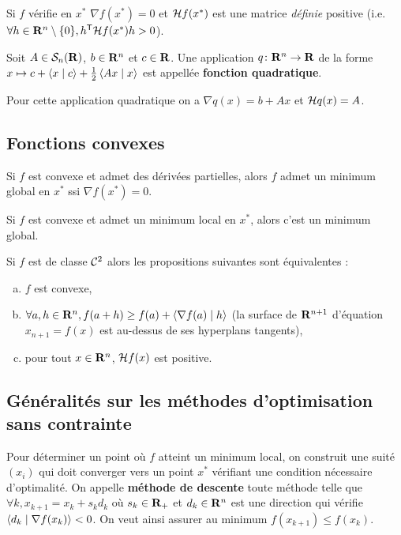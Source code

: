 \begin{thm}
	Si $f$ vérifie en $x^*$ $\nabla f(x^*) = 0$ et $\mathcal{H} f(x^*)$ est une matrice \emph{définie} positive (i.e. $\forall h \in \mathbf{R}^n \setminus \{ 0 \}, h^\mathsf{T} \mathcal{H} f(x^*) h > 0$).
\end{thm}

\begin{defn}
	Soit $A \in \mathcal{S}_n(\mathbf{R})$, $b \in \mathbf{R}^n$ et $c \in \mathbf{R}$.
	Une application $q \colon \mathbf{R}^n \to \mathbf{R}$ de la forme $x \mapsto c + \left\langle x \mid c \right\rangle + \frac{1}{2} \left\langle Ax \mid x \right\rangle$ est appellée \textbf{fonction quadratique}.
\end{defn}

Pour cette application quadratique on a $\nabla q(x) = b + Ax$ et $\mathcal{H} q(x) = A$.


\subsection{Fonctions convexes}

	\begin{thm}
		Si $f$ est convexe et admet des dérivées partielles, alors $f$ admet un minimum global en $x^*$ ssi $\nabla f(x^*) = 0$.
	\end{thm}

	\begin{thm}
		Si $f$ est convexe et admet un minimum local en $x^*$, alors c'est un minimum global.
	\end{thm}

	\begin{thm}
		Si $f$ est de classe $\mathcal{C}^2$ alors les propositions suivantes sont équivalentes :
		\begin{enumerate}[(a)]
			\item $f$ est convexe,
			\item $\forall a, h \in \mathbf{R}^n, f(a + h) \geq f(a) + \left\langle \nabla f(a) \mid h \right\rangle$ (la surface de $\mathbf{R}^{n + 1}$ d'équation $x_{n + 1} = f(x)$ est au-dessus de ses hyperplans tangents),
			\item pour tout $x \in \mathbf{R}^n$, $\mathcal{H} f(x)$ est positive.
		\end{enumerate}
	\end{thm}


\subsection{Généralités sur les méthodes d'optimisation sans contrainte}

	Pour déterminer un point où $f$ atteint un minimum local, on construit une suité $(x_i)$ qui doit converger vers un point $x^*$ vérifiant une condition nécessaire d'optimalité.
	On appelle \textbf{méthode de descente} toute méthode telle que $\forall k, x_{k + 1} = x_k + s_k d_k$ où $s_k \in \mathbf{R}_+$ et $d_k \in \mathbf{R}^n$ est une direction qui vérifie $\left\langle d_k \mid \nabla f(x_k) \right\rangle < 0$.
	On veut ainsi assurer au minimum $f(x_{k + 1}) \leq f(x_k)$.
	
